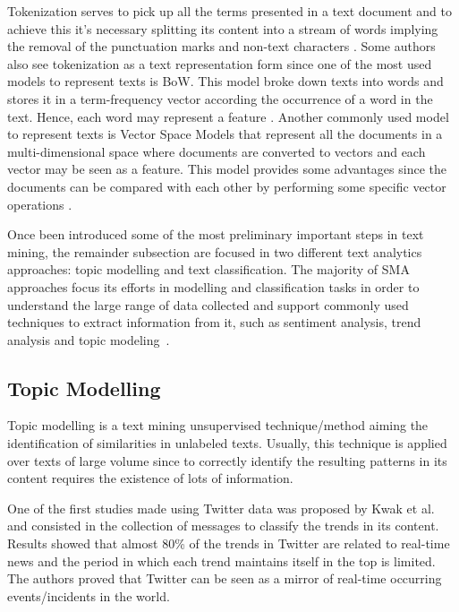 Tokenization serves to pick up all the terms presented in a text document and to achieve this it's necessary splitting its content into a stream of words implying the removal of the punctuation marks and non-text characters \cite{hotho2005brief}. Some authors also see tokenization as a text representation form since one of the most used models to represent texts is \gls{BoW}. This model broke down texts into words and stores it in a term-frequency vector according the occurrence of a word in the text. Hence, each word may represent a feature \cite{sriram2010short}. Another commonly used model to represent texts is Vector Space Models that represent all the documents in a multi-dimensional space where documents are converted to vectors and each vector may be seen as a feature. This model provides some advantages since the documents can be compared with each other by performing some specific vector operations \cite{hotho2005brief}.

Once been introduced some of the most preliminary important steps in text mining, the remainder subsection are focused in two different text analytics approaches: topic modelling and text classification. The majority of \gls{SMA} approaches focus its efforts in modelling and classification tasks in order to understand the large range of data collected and support commonly used techniques to extract information from it, such as sentiment analysis, trend analysis and topic modeling~\cite{fan2013unveiling}.

\subsection{Topic Modelling}
\label{subsec:topic_modelling_sota}

Topic modelling is a text mining unsupervised technique/method aiming the identification of similarities in unlabeled texts. Usually, this technique is applied over texts of large volume since to correctly identify the resulting patterns in its content requires the existence of lots of information.

One of the first studies made using Twitter data was proposed by Kwak et al.~\cite{kwak2010twitter} and consisted in the collection of messages to classify the trends in its content. Results showed that almost 80\% of the trends in Twitter are related to real-time news and the period in which each trend maintains itself in the top is limited. The authors proved that Twitter can be seen as a mirror of real-time occurring events/incidents in the world.

